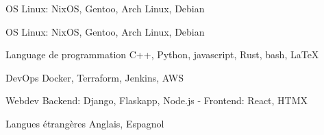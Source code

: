 

\begin{cvskills}

  \cvskill
    {OS} %
    {Linux: NixOS, Gentoo, Arch Linux, Debian} %

  \cvskill
    {OS} %
    {Linux: NixOS, Gentoo, Arch Linux, Debian} %

  \cvskill
    {Language de programmation} %
    {C++, Python, javascript, Rust, bash, LaTeX}

  \cvskill
    {DevOps} %
    {Docker, Terraform, Jenkins, AWS} %

  \cvskill
    {Webdev} %
    {Backend: Django, Flaskapp, Node.js - Frontend: React, HTMX} %

  \cvskill
    {Langues étrangères} %
    {Anglais, Espagnol} %

\end{cvskills}
